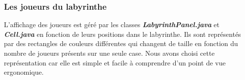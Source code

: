 \subsubsection*{Les joueurs du labyrinthe}

L'affichage des joueurs est géré par les classes \textbf{\textit{LabyrinthPanel.java}} et \textbf{\textit{Cell.java}} en fonction de leurs positions dans le labyrinthe. Ils sont représentés par des rectangles de couleurs différentes qui changent de taille en fonction du nombre de joueurs présents sur une seule case. Nous avons choisi cette représentation car elle est simple et facile à comprendre d'un point de vue ergonomique.

\begin{figure}[!htb]
    \centering
    \qquad

\end{figure}
